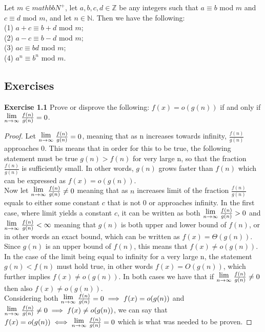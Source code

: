 \documentclass[a4paper]{article}
\newcommand{\Lim}[1]{\raisebox{0.5ex}{{$\displaystyle \lim_{#1}\;$}}}
\begin{document}
\begin{theorem}
Let $m \in mathbb{N}^{+}$, let $a, b, c, d \in \mathbb{Z}$ be any integers such that $a \equiv b$ mod $m$ and $c \equiv d$ mod $m$, and let $n \in \mathbb{N}$. Then we have the following:\\
(1) $a + c \equiv b + d$ mod $m$;\\
(2) $a - c \equiv b - d$ mod $m$;\\
(3) $ac \equiv bd$ mod $m$;\\
(4) $a^{n} \equiv b^{n}$ mod $m$.
\end{theorem}



\begin{samepage}
\section{Exercises}
\noindent \textbf{Exercise 1.1} Prove or disprove the following: $f(x) = o(g(n))$ if and only if $\Lim{n \to \infty} \frac{f(n)}{g(n)}=0$.
\begin{proof}
Let $\Lim{n \to \infty} \frac{f(n)}{g(n)}=0$, meaning that as n increases towards infinity, $\frac{f(n)}{g(n)}$ approaches $0$. This means that in order for this to be true, the following statement must be true $g(n) > f(n)$ for very large n, so that the fraction $\frac{f(n)}{g(n)}$ is sufficiently small. In other words, $g(n)$ grows faster than $f(n)$ which can be expressed as $f(x) = o(g(n))$. \\
Now let $\Lim{n \to \infty} \frac{f(n)}{g(n)}\neq0$ meaning that as $n$ increases limit of the fraction $\frac{f(n)}{g(n)}$ equals to either some constant $c$ that is not $0$ or approaches infinity. In the first case, where limit yields a constant $c$, it can be written as both $\Lim{n \to \infty} \frac{f(n)}{g(n)}>0$ and $\Lim{n \to \infty} \frac{f(n)}{g(n)}<\infty$ meaning that $g(n)$ is both upper and lower bound of $f(n)$, or in other words an exact bound, which can be written as $f(x) = \Theta(g(n))$. Since $g(n)$ is an upper bound of $f(n)$, this means that $f(x) \neq o(g(n))$. In the case of the limit being equal to infinity for a very large n, the statement $g(n) < f(n)$ must hold true, in other words $f(x) = O(g(n))$, which further implies $f(x) \neq o(g(n))$. In both cases we have that if $\Lim{n \to \infty} \frac{f(n)}{g(n)}\neq0$ then also $f(x) \neq o(g(n))$. \\
Considering both $\Lim{n \to \infty} \frac{f(n)}{g(n)}=0 \implies f(x) = o(g(n))$ and $\Lim{n \to \infty} \frac{f(n)}{g(n)}\neq0 \implies f(x) \neq o(g(n))$, we can say that $f(x) = o(g(n)) \iff \Lim{n \to \infty} \frac{f(n)}{g(n)}=0$ which is what was needed to be proven.
\end{proof}
\end{samepage}
\end{document}
